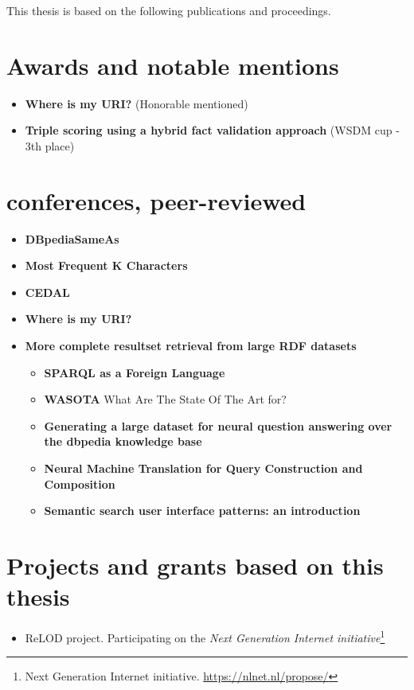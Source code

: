 This thesis is based on the following publications and proceedings.

\section{Awards and notable mentions}

\begin{itemize}
    \item \textbf{Where is my URI?} (Honorable mentioned) \cite{valdestilhas2018my}
    \item \textbf{Triple scoring using a hybrid fact validation approach} (WSDM cup - 3th place) \cite{marx2017triple}
\end{itemize}

\section{conferences, peer-reviewed}

\begin{itemize}
    \item \textbf{DBpediaSameAs} \cite{valdestilhas2015dbpediasameas}
    \item \textbf{Most Frequent K Characters} \cite{valdestilhas2017high}
    \item \textbf{CEDAL} \cite{valdestilhas2017cedal}
    \item \textbf{Where is my URI?} \cite{valdestilhas2018my}
    \item \textbf{More complete resultset retrieval from large RDF datasets} \cite{ValdestilhasKcap}
    \begin{itemize}
        \item \textbf{SPARQL as a Foreign Language} \cite{soru2017sparql}
        \item \textbf{WASOTA} What Are The State Of The Art for? \cite{neto2016wasota}
        \item \textbf{Generating a large dataset for neural question answering over the dbpedia knowledge base}        \cite{hartmann2018generating}
        \item \textbf{Neural Machine Translation for Query Construction and Composition} \cite{soru2018neural}
        \item \textbf{Semantic search user interface patterns: an introduction} \cite{marx2017semantic}
    \end{itemize}
\end{itemize}

\section{Projects and grants based on this thesis}
\begin{itemize}
    \item ReLOD project. Participating on the \textit{Next Generation Internet initiative}\footnote{Next Generation Internet initiative. \url{https://nlnet.nl/propose/}}
\end{itemize}

